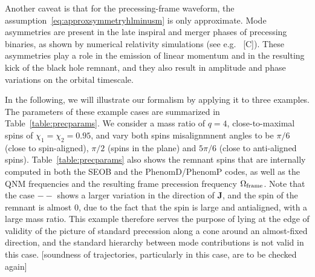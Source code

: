 \documentclass[aps,showpacs,twocolumn,
prd,superscriptaddress,nofootinbib]{revtex4-1}
\newcommand{\SM}[1]{{\color{Red} #1}}
\begin{document}
Another caveat is that for the precessing-frame waveform, the assumption~\eqref{eq:approxsymmetryhlminusm} is only approximate. Mode asymmetries are present in the late inspiral and merger phases of precessing binaries, as shown by numerical relativity simulations (see e.g.~\cite{} \SM{[C]}). These asymmetries play a role in the emission of linear momentum and in the resulting kick of the black hole remnant, and they also result in amplitude and phase variations on the orbital timescale.

In the following, we will illustrate our formalism by applying it to three examples. The parameters of these example cases are summarized in Table~\ref{table:precparams}. We consider a mass ratio of $q=4$, close-to-maximal spins of $\chi_{1} = \chi_{2} = 0.95$, and vary both spins misalignmnent angles to be $\pi/6$ (close to spin-aligned), $\pi/2$ (spins in the plane) and $5\pi/6$ (close to anti-aligned spins). Table~\ref{table:precparams} also shows the remnant spins that are internally computed in both the SEOB and the PhenomD/PhenomP codes, as well as the QNM frequencies and the resulting frame precession frequency $\Omega_{\rm frame}$. Note that the case $--$ shows a larger variation in the direction of $\bm{J}$, and the spin of the remnant is almost 0, due to the fact that the spin is large and antialigned, with a large mass ratio. This example therefore serves the purpose of lying at the edge of validity of the picture of standard precession along a cone around an almost-fixed direction, and the standard hierarchy between mode contributions is not valid in this case. \SM{[soundness of trajectories, particularly in this case, are to be checked again]}
\end{document}
